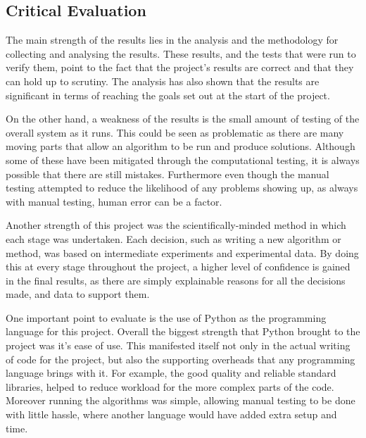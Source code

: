 \documentclass[12pt]{report}
\begin{document}
\subsection{Critical Evaluation}\label{Eval}
The main strength of the results lies in the analysis and the methodology for collecting and analysing the results. These results, and the tests that were run to verify them, point to the fact that the project's results are correct and that they can hold up to scrutiny. The analysis has also shown that the results are significant in terms of reaching the goals set out at the start of the project. 

On the other hand, a weakness of the results is the small amount of testing of the overall system as it runs. This could be seen as problematic as there are many moving parts that allow an algorithm to be run and produce solutions. Although some of these have been mitigated through the computational testing, it is always possible that there are still mistakes. Furthermore even though the manual testing attempted to reduce the likelihood of any problems showing up, as always with manual testing, human error can be a factor.

Another strength of this project was the scientifically-minded method in which each stage was undertaken. Each decision, such as writing a new algorithm or method, was based on intermediate experiments and experimental data. By doing this at every stage throughout the project, a higher level of confidence is gained in the final results, as there are simply explainable reasons for all the decisions made, and data to support them.

One important point to evaluate is the use of Python as the programming language for this project. Overall the biggest strength that Python brought to the project was it's ease of use. This manifested itself not only in the actual writing of code for the project, but also the supporting overheads that any programming language brings with it. For example, the good quality and reliable standard libraries, helped to reduce workload for the more complex parts of the code. Moreover running the algorithms was simple, allowing manual testing to be done with little hassle, where another language would have added extra setup and time. 
\end{document}
